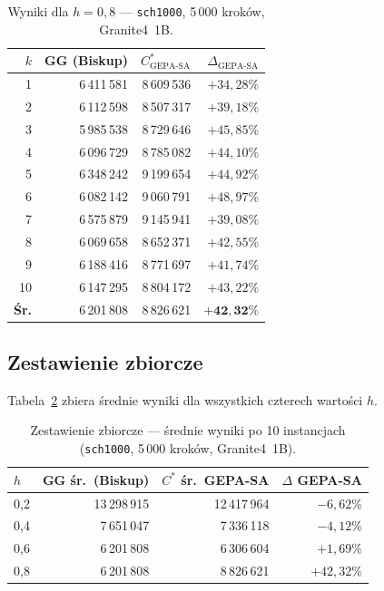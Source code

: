 \documentclass[11pt,a4paper]{article}
\begin{document}
\begin{table}[ht]
\centering
\caption{Wyniki dla $h = 0{,}8$ — \texttt{sch1000}, 5\,000 kroków, Granite4~1B.}
\label{tab:h08}
\begin{tabular}{@{}rrrr@{}}
\toprule
$k$ & GG (Biskup) & $C^*_{\text{GEPA-SA}}$ & $\Delta_{\text{GEPA-SA}}$ \\
\midrule
 1 & 6\,411\,581 & 8\,609\,536 & $+34{,}28\%$ \\
 2 & 6\,112\,598 & 8\,507\,317 & $+39{,}18\%$ \\
 3 & 5\,985\,538 & 8\,729\,646 & $+45{,}85\%$ \\
 4 & 6\,096\,729 & 8\,785\,082 & $+44{,}10\%$ \\
 5 & 6\,348\,242 & 9\,199\,654 & $+44{,}92\%$ \\
 6 & 6\,082\,142 & 9\,060\,791 & $+48{,}97\%$ \\
 7 & 6\,575\,879 & 9\,145\,941 & $+39{,}08\%$ \\
 8 & 6\,069\,658 & 8\,652\,371 & $+42{,}55\%$ \\
 9 & 6\,188\,416 & 8\,771\,697 & $+41{,}74\%$ \\
10 & 6\,147\,295 & 8\,804\,172 & $+43{,}22\%$ \\
\midrule
\textbf{Śr.} & 6\,201\,808 & 8\,826\,621 & $\mathbf{+42{,}32\%}$ \\
\bottomrule
\end{tabular}
\end{table}

\subsection{Zestawienie zbiorcze}

Tabela~\ref{tab:summary} zbiera średnie wyniki dla wszystkich czterech
wartości $h$.

\begin{table}[ht]
\centering
\caption{Zestawienie zbiorcze — średnie wyniki po 10 instancjach
         (\texttt{sch1000}, 5\,000 kroków, Granite4~1B).}
\label{tab:summary}
\begin{tabular}{@{}lrrr@{}}
\toprule
$h$ & GG śr.\ (Biskup) & $C^*$ śr.\ GEPA-SA & $\Delta$ GEPA-SA \\
\midrule
0{,}2 & 13\,298\,915 & 12\,417\,964 & $-6{,}62\%$ \\
0{,}4 &  7\,651\,047 &  7\,336\,118 & $-4{,}12\%$ \\
0{,}6 &  6\,201\,808 &  6\,306\,604 & $+1{,}69\%$ \\
0{,}8 &  6\,201\,808 &  8\,826\,621 & $+42{,}32\%$ \\
\bottomrule
\end{tabular}
\end{table}
\end{document}

